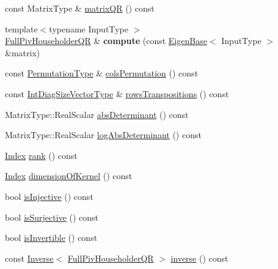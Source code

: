 \begin{DoxyCompactItemize}
\item 
const Matrix\+Type \& \hyperlink{group___q_r___module_a9c16411e5d8f1fc634a5797018d5aa3e}{matrix\+QR} () const
\item 
\mbox{\label{group___q_r___module_aadf0f38d53a132dd246abe527175d058}} 
{\footnotesize template$<$typename Input\+Type $>$ }\\\hyperlink{group___q_r___module_class_eigen_1_1_full_piv_householder_q_r}{Full\+Piv\+Householder\+QR} \& {\bfseries compute} (const \hyperlink{group___core___module_struct_eigen_1_1_eigen_base}{Eigen\+Base}$<$ Input\+Type $>$ \&matrix)
\item 
const \hyperlink{group___core___module}{Permutation\+Type} \& \hyperlink{group___q_r___module_abeda6d91e196c13d4dd8b7542fef3e17}{cols\+Permutation} () const
\item 
const \hyperlink{group___core___module}{Int\+Diag\+Size\+Vector\+Type} \& \hyperlink{group___q_r___module_abebbfc0ca6e3dd285a0ad0c907abb093}{rows\+Transpositions} () const
\item 
Matrix\+Type\+::\+Real\+Scalar \hyperlink{group___q_r___module_a11400130bbbdc062ef613e080fed2f23}{abs\+Determinant} () const
\item 
Matrix\+Type\+::\+Real\+Scalar \hyperlink{group___q_r___module_a0e4fbf30f8f3418de5e54705659fc424}{log\+Abs\+Determinant} () const
\item 
\hyperlink{namespace_eigen_a62e77e0933482dafde8fe197d9a2cfde}{Index} \hyperlink{group___q_r___module_aeae555220f46477818ccc94aca2de770}{rank} () const
\item 
\hyperlink{namespace_eigen_a62e77e0933482dafde8fe197d9a2cfde}{Index} \hyperlink{group___q_r___module_a3b5fe5edc66acc01c45b16e728470aa0}{dimension\+Of\+Kernel} () const
\item 
bool \hyperlink{group___q_r___module_a6776788011026b0f63192485a59deaed}{is\+Injective} () const
\item 
bool \hyperlink{group___q_r___module_aa3593db4708ce9079b0bdf219b99f57e}{is\+Surjective} () const
\item 
bool \hyperlink{group___q_r___module_aeb1d779ec22ec68a5a28d4235db02ec1}{is\+Invertible} () const
\item 
const \hyperlink{class_eigen_1_1_inverse}{Inverse}$<$ \hyperlink{group___q_r___module_class_eigen_1_1_full_piv_householder_q_r}{Full\+Piv\+Householder\+QR} $>$ \hyperlink{group___q_r___module_a352ce66397af06da214ddde343cec6f5}{inverse} () const
\item 

\end{DoxyCompactItemize}
